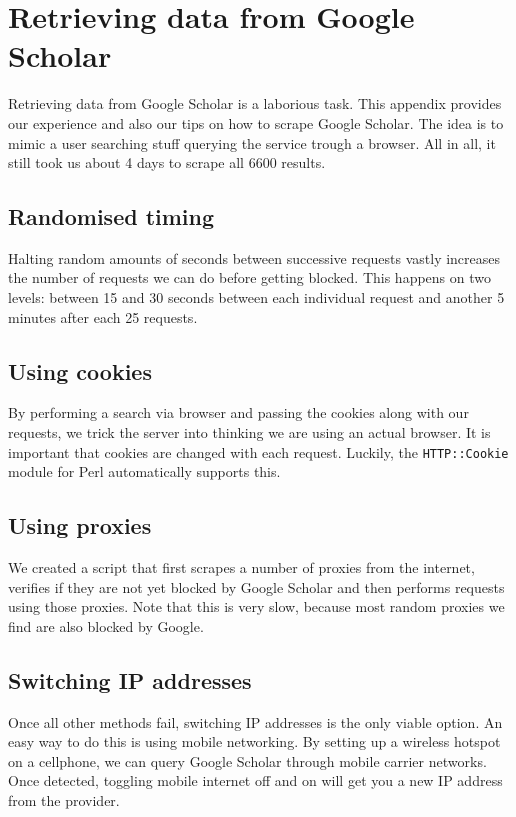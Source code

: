 \section{Retrieving data from Google Scholar}
\label{sec:googlescholar}

Retrieving data from Google Scholar is a laborious task. This appendix provides our experience and also our tips on how to scrape Google Scholar. The idea is to mimic a user searching stuff querying the service trough a browser. All in all, it still took us about 4 days to scrape all 6600 results.

\subsection{Randomised timing} 
Halting random amounts of seconds between successive requests vastly increases the number of requests we can do before getting blocked. This happens on two levels: between 15 and 30 seconds between each individual request and another 5 minutes after each 25 requests. 

\subsection{Using cookies} 
By performing a search via browser and passing the cookies along with our requests, we trick the server into thinking we are using an actual browser. It is important that cookies are changed with each request. Luckily, the \texttt{HTTP::Cookie} module for Perl automatically supports this.

\subsection{Using proxies}
We created a script that first scrapes a number of proxies from the internet, verifies if they are not yet blocked by Google Scholar and then performs requests using those proxies. Note that this is very slow, because most random proxies we find are also blocked by Google.

\subsection{Switching IP addresses}
Once all other methods fail, switching IP addresses is the only viable option. An easy way to do this is using mobile networking. By setting up a wireless hotspot on a cellphone, we can query Google Scholar through mobile carrier networks. Once detected, toggling mobile internet off and on will get you a new IP address from the provider.
